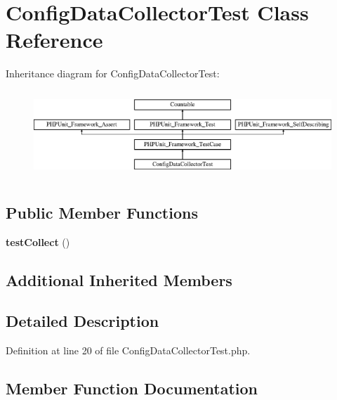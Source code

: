 \section{Config\+Data\+Collector\+Test Class Reference}
\label{class_symfony_1_1_component_1_1_http_kernel_1_1_tests_1_1_data_collector_1_1_config_data_collector_test}
Inheritance diagram for Config\+Data\+Collector\+Test\+:\begin{figure}[H]
\begin{center}
\leavevmode
\includegraphics[height=3.303835cm]{class_symfony_1_1_component_1_1_http_kernel_1_1_tests_1_1_data_collector_1_1_config_data_collector_test}
\end{center}
\end{figure}
\subsection*{Public Member Functions}
\begin{DoxyCompactItemize}
\item 
{\bf test\+Collect} ()
\end{DoxyCompactItemize}
\subsection*{Additional Inherited Members}


\subsection{Detailed Description}


Definition at line 20 of file Config\+Data\+Collector\+Test.\+php.



\subsection{Member Function Documentation}
